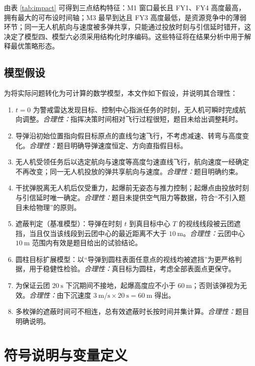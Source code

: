 \documentclass[11pt,a4paper]{ctexart}
\begin{document}
由表 \ref{tab:impact} 可得到三点结构特征：M1 窗口最长且 FY1、FY4 高度最高，拥有最大的可布设时间轴；M3 最早到达且 FY3 高度最低，是资源竞争中的薄弱环节；同一无人机航向与速度被多弹共享，只能通过投放时刻与引信延时错开，这决定了模型四、模型六必须采用结构化时序编码。这些特征将在结果分析中用于解释最优策略形态。

\subsection{模型假设}

为将实际问题转化为可计算的数学模型，本文作如下假设，并说明其合理性：

\begin{enumerate}[label=\textbf{假设\arabic*.}]
  \item $t=0$ 为警戒雷达发现目标、控制中心指派任务的时刻，无人机可瞬时完成航向调整。\textit{合理性：}指挥决策时间相对飞行过程很短，题目未给出调整耗时。
  \item 导弹沿初始位置指向假目标原点的直线匀速飞行，不考虑减速、转弯与高度变化。\textit{合理性：}题目明确导弹速度恒定、方向直指假目标。
  \item 无人机受领任务后以选定航向与速度等高度匀速直线飞行，航向速度一经确定不再改变；同一无人机投放的弹共享航向与速度。\textit{合理性：}题目明确约束。
  \item 干扰弹脱离无人机后仅受重力，起爆前无姿态与推力控制；起爆点由投放时刻与引信延时唯一确定。\textit{合理性：}题目未提供空气阻力等数据，符合“不引入题目未给物理”的原则。
  \item 遮蔽判定（基准模型）：导弹在时刻 $t$ 到真目标中心 $T$ 的视线线段被云团遮挡，当且仅当该线段到云团中心的最近距离不大于 $10~\mathrm{m}$。\textit{合理性：}云团中心 $10~\mathrm{m}$ 范围内有效是题目给出的试验结论。
  \item 圆柱目标扩展模型：以“导弹到圆柱表面任意点的视线均被遮挡”为更严格判据，用于稳健性检验。\textit{合理性：}真目标为圆柱，考虑全部表面点更保守。
  \item 为保证云团 $20~\mathrm{s}$ 下沉期间不接地，起爆高度应不小于 $60~\mathrm{m}$；否则该弹视为无效。\textit{合理性：}由下沉速度 $3~\mathrm{m/s} \times 20~\mathrm{s}=60~\mathrm{m}$ 得出。
  \item 多枚弹的遮蔽时间可不相连，总有效遮蔽时长按时间并集计算。\textit{合理性：}题目明确说明。
\end{enumerate}

\section{符号说明与变量定义}
\end{document}

